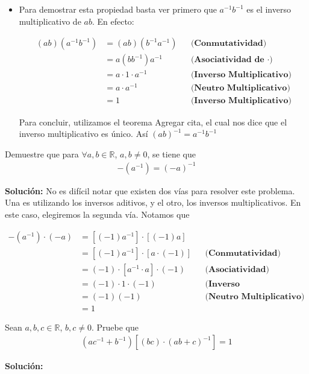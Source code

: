 \documentclass[12pt]{book}
\begin{document}
\begin{itemize}
\item[\textbf{d)}] Para demostrar esta propiedad basta ver primero que $a^{-1}b^{-1}$ es el inverso multiplicativo de $ab$. En efecto:

\begin{align*}
    (ab)(a^{-1}b^{-1})&=(ab)(b^{-1}a^{-1}) && \textbf{(Conmutatividad)} \\
    &=a(bb^{-1})a^{-1} && \textbf{(Asociatividad de $\cdot$)} \\
    &= a \cdot 1 \cdot a^{-1} && \textbf{(Inverso Multiplicativo)} \\
    &= a \cdot a^{-1} && \textbf{(Neutro Multiplicativo)} \\
    &= 1 && \textbf{(Inverso Multiplicativo)}
\end{align*}

Para concluir, utilizamos el teorema {\Large Agregar cita}, el cual nos dice que el inverso multiplicativo es único. Así $(ab)^{-1}=a^{-1} b^{-1}$
\end{itemize}
\begin{prob}{}{}
 Demuestre que para $\forall a,b \in \mathbb{R
 }$, $a,b \neq 0$, se tiene que 
\begin{align*}
     -(a^{-1})=(-a)^{-1}
\end{align*}
\end{prob}
\textbf{Solución:} No es difícil notar que existen dos vías para resolver este problema. Una es utilizando los inversos aditivos, y el otro, los inversos multiplicativos. En este caso, elegiremos la segunda vía. Notamos que 

\begin{align*}
    -(a^{-1})\cdot (-a)&=[(-1)a^{-1}] \cdot [(-1)a] && \\
    &= [(-1)a^{-1}] \cdot [a \cdot (-1)] && \textbf{(Conmutatividad)} \\
    &= (-1) \cdot [a^{-1} \cdot a] \cdot (-1) && \textbf{(Asociatividad)} \\
    &= (-1) \cdot 1 \cdot (-1) && \textbf{(Inverso Multiplicativo)} \\
    &=(-1)(-1) && \textbf{(Neutro Multiplicativo)} \\
    &=1
\end{align*}

\begin{prob}{}{}
    Sean $a,b,c \in \mathbb{R}$, $b,c\neq 0$. Pruebe que 
    \begin{align*}
        (ac^{-1}+b^{-1})[(bc)\cdot (ab+c)^{-1}]=1
    \end{align*}
\end{prob}
\textbf{Solución:}
\end{document}
